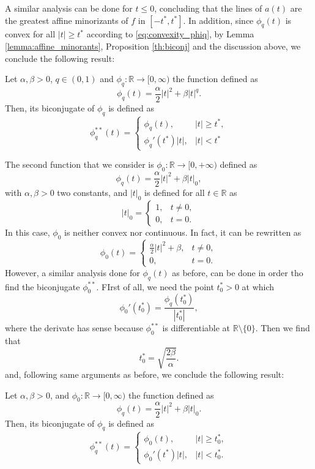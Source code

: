 A similar analysis can be done for $t\le 0$, concluding that the lines of $a(t)$ are the greatest affine minorizants of $f$ in $[-t^*, t^*]$. In addition, since $\phi_q(t)$ is convex for all $|t|\ge t^*$ according to \eqref{eq:convexity_phiq}, by Lemma \ref{lemma:affine_minorants}, Proposition \ref{th:biconj} and the discussion above, we conclude the following result:
\begin{lemma}
    Let $\alpha, \beta>0$, $q\in (0,1)$ and $\phi_q: \mathbb{R}\to [0,\infty)$ the function defined as 
    \[
    \phi_q(t)=\frac{\alpha}{2}|t|^2 + \beta |t|^q.
    \]
    Then, its biconjugate of $\phi_q$ is defined as
    \begin{equation}\label{eq:convex_envelope_phi}
    \phi_q^{**}(t)=\begin{cases}
        \phi_q(t), &|t|\ge t^*,\\
        \phi_{q}'(t^*)|t|, & |t|< t^*
    \end{cases}
\end{equation}
\end{lemma}
The second function that we consider is $\phi_0: \mathbb{R}\to [0,+\infty)$ defined as
\[
\phi_q(t)= \frac{\alpha}{2}|t|^2+\beta |t|_0,
\]
with $\alpha, \beta>0$ two constants, and $|t|_0$ is defined for all $t\in \mathbb{R}$ as
\[
|t|_0=\begin{cases}
    1, & t \ne 0,\\
    0, & t=0.
\end{cases}
\]
In this case, $\phi_0$ is neither convex nor continuous. In fact, it can be rewritten as 
\[
\phi_0(t)=\begin{cases}
    \frac{\alpha}{2}|t|^2+\beta, & t \ne 0,\\
    0, & t=0.
\end{cases}
\]
However, a similar analysis done for $\phi_q(t)$ as before, can be done in order tho find the biconjugate $\phi^{**}_0$. FIrst of all, we need the point $t^*_0>0$ at which
\[
\phi_0'(t^*_0)=\frac{\phi_q(t^*_0)}{|t^*_0|},
\]
where the derivate has sense because $\phi^{**}_0$ is differentiable at $\mathbb{R}\setminus \{0\}$. Then we find that 
\[
t_0^*=\sqrt{\frac{2\beta}{\alpha}}.
\]
and, following same arguments as before, we conclude the following result:
\begin{lemma}
    Let $\alpha, \beta>0$, and $\phi_0: \mathbb{R}\to [0,\infty)$ the function defined as 
    \[
    \phi_q(t)=\frac{\alpha}{2}|t|^2 + \beta |t|_0.
    \]
    Then, its biconjugate of $\phi_q$ is defined as
    \[
    \phi_q^{**}(t)=\begin{cases}
        \phi_0(t), &|t|\ge t_0^*,\\
        \phi_0'(t^*)|t|, & |t|< t_0^*.
    \end{cases}
    \]
\end{lemma}

